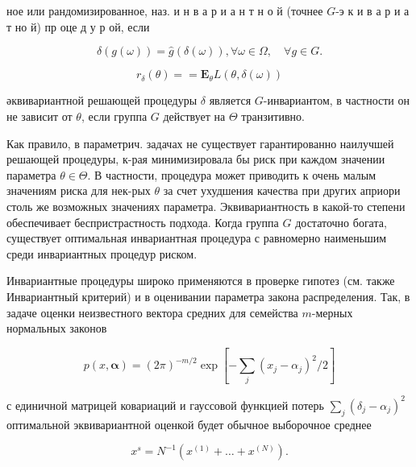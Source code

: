 \documentclass[10pt]{article}
\begin{document}
ное или рандомизированное, наз. и н в а р и а н т н о й (точнее $G$-э к и в а р и а т но й) пр оце д у р ой, если



\[

\delta(g(\omega))=\hat{g}(\delta(\omega)), \forall \omega \in \Omega, \quad \forall g \in G .

\]



\[

r_{\delta}(\theta)==\mathbf{E}_{\theta} L(\theta, \delta(\omega))

\]



әквивариантной решающей процедуры $\delta$ является $G$-инвариантом, в частности он не зависит от $\theta$, если группа $G$ действует на $\Theta$ транзитивно.



Как правило, в параметрич. задачах не существует гарантированно наилучшей решающей процедуры, к-рая минимизировала бы риск при каждом значении параметра $\theta \in \Theta$. В частности, процедура может приводить к очень малым значениям риска для нек-рых $\theta$ за счет ухудшения качества при других априори столь же возможных значениях параметра. Эквивариантность в какой-то степени обеспечивает беспристрастность подхода. Когда группа $G$ достаточно богата, существует оптимальная инвариантная процедура с равномерно наименьшим среди инвариантных процедур риском.



Инвариантные процедуры широко применяются в проверке гипотез (см. также Инвариантный критерий) и в оценивании параметра закона распределения. Так, в задаче оценки неизвестного вектора средних для семейства $m$-мерных нормальных законов



\[

p(x, \boldsymbol{\alpha})=(2 \pi)^{-m / 2} \exp \left[-\sum_{j}\left(x_{j}-\alpha_{j}\right)^{2} / 2\right]

\]



с единичной матрицей ковариаций и гауссовой функцией потерь $\sum_{j}\left(\delta_{j}-\alpha_{j}\right)^{2}$ оптимальной эквивариантной оценкой будет обычное выборочное среднее



\[

x^{s}=N^{-1}\left(x^{(1)}+\ldots+x^{(N)}\right) .

\]
\end{document}
